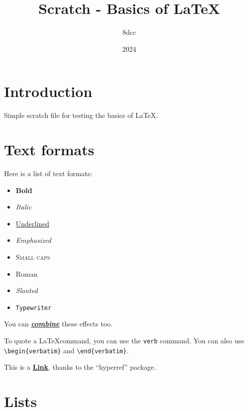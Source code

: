 \documentclass{article}
\title{Scratch - Basics of \LaTeX}
\author{8dcc}
\date{2024}
\begin{document}
\maketitle
\newpage

\tableofcontents
\newpage

\section{Introduction}

Simple scratch file for testing the basics of \LaTeX.

\section{Text formats}

Here is a list of text formats:

\begin{itemize}
  \item \textbf{Bold}
  \item \textit{Italic}
  \item \underline{Underlined}
  \item \emph{Emphasized}
  \item \textsc{Small caps}
  \item \textrm{Roman}
  \item \textsl{Slanted}
  \item \texttt{Typewriter}
\end{itemize}

You can \underline{\textbf{\textit{combine}}} these effects too.

To quote a \LaTeX command, you can use the \verb|verb| command. You can also use
\verb|\begin{verbatim}| and \verb|\end{verbatim}|.

This is a \href{http://github.com/8dcc}{\textbf{Link}}, thanks to the
``hyperref'' package.

\section{Lists}
\end{document}
